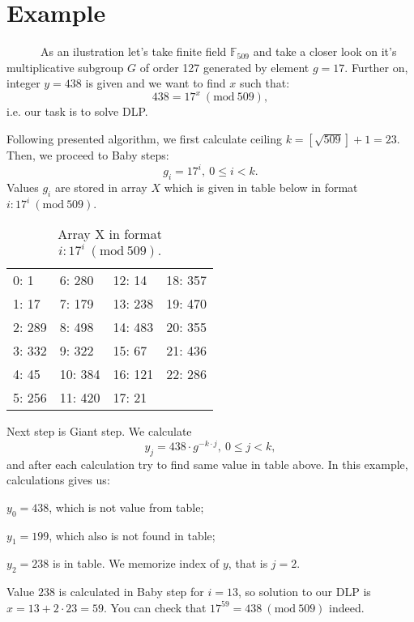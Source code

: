 \documentclass[fleqn,10pt]{olplainarticle}
\begin{document}
\section*{Example}

\par \ \ \ \ \ \ As an ilustration let's take finite field $\mathbb{F}_{509}$ 
and take a closer look on it's multiplicative subgroup $G$ of 
order 127 generated by element $g=17$. Further on, integer 
$y=438$ is given and we want to find $x$ such that:
$$438=17^x\ (\textrm {mod}\ 509),$$
i.e. our task is to solve DLP.

Following presented algorithm, we first calculate ceiling $k=[\sqrt{509}]+1=23$. Then, we proceed to Baby steps:
$$g_i = 17^i,\ 0\leq i < k.$$
Values $g_i$ are stored in array $X$ which is given in table below in format $i: 17^i\ (\textrm{mod}\ 509).$

\begin{table}[ht]
\centering
\begin{tabular}{|l|l|l|l|}
  0: 1   & 6: 280  & 12: 14 & 18: 357\\
  1: 17  & 7: 179 & 13: 238 & 19: 470 \\
  2: 289 & 8:  498 & 14: 483 & 20: 355\\
  3: 332 & 9:  322 & 15: 67 & 21: 436 \\
  4: 45 & 10: 384 & 16: 121 & 22: 286\\
  5: 256 & 11: 420 & 17: 21 
\end{tabular}
\caption{\label{tab:widgets}Array X in format $i: 17^i\ (\textrm{mod}\ 509).$}
\end{table}


Next step is Giant step. We calculate
$$y_j = 438\cdot g^{-k\cdot j},\ 0\leq j< k,$$
and after each calculation try to find same value in table above. In this example, calculations gives us:

$y_0 = 438$, which is not value from table; 

$y_1 = 199$, which also is not found in table; 

$y_2=238$ is in table. We memorize index of $y$, that is $j=2$.

Value $238$ is calculated in Baby step for $i=13$, so solution 
to our DLP is $x=13+2\cdot 23=59.$ You can check that 
$17^{59}=438\ (\textrm{mod}\ 509)$ indeed.
\end{document}
